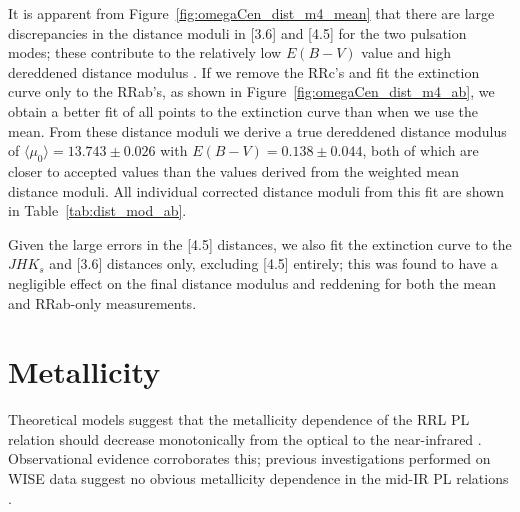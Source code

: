 \documentclass[a4paper,fleqn,usenatbib]{mnras}
\begin{document}

It is apparent from Figure~\ref{fig:omegaCen_dist_m4_mean} that there are large discrepancies in the distance moduli in [3.6] and [4.5] for the two pulsation modes; these contribute to the relatively low $E(B-V)$ value and high dereddened distance modulus \citep{2002ASPC..265...95L, 2006ApJ...652..362D}. 
If we remove the RRc's and fit the extinction curve only to the RRab's, as shown in Figure~\ref{fig:omegaCen_dist_m4_ab}, we obtain a better fit of all points to the extinction curve than when we use the mean. From these distance moduli we derive a true dereddened distance modulus of $\langle \mu_0 \rangle = 13.743 \pm 0.026$ with $E(B-V) = 0.138 \pm 0.044$, both of which are closer to accepted values than the values derived from the weighted mean distance moduli. All individual corrected distance moduli from this fit are shown in Table~\ref{tab:dist_mod_ab}.

Given the large errors in the [4.5] distances, we also fit the extinction curve to the $JHK_s$ and [3.6] distances only, excluding [4.5] entirely; this was found to have a negligible effect on the final distance modulus and reddening for both the mean and RRab-only measurements.

\section{Metallicity}
\label{sec:metallicity}

Theoretical models suggest that the metallicity dependence of the RRL PL relation should decrease monotonically from the optical to the near-infrared \citep{2001MNRAS.326.1183B, 2004ApJS..154..633C}. Observational evidence corroborates this; previous investigations performed on WISE data suggest no obvious metallicity dependence in the mid-IR PL relations \citep{2013ApJ...776..135M}.
\end{document}
